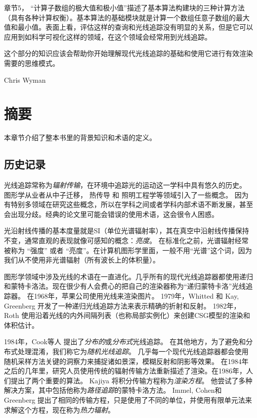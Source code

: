 \documentclass[12pt]{article}
\begin{document}
章节\color{blue}5\color{black}， “计算子数组的极大值和极小值”描述了基本算法构建块的三种计算方法（具有各种计算权衡）。基本算法的基础模块就是计算一个数组任意子数组的最大值和最小值。表面上看，评估这样的查询和光线追踪没有明显的关系，但是它可以应用到如科学可视化这样的领域，在这个领域会经常用到光线追踪。

这个部分的知识应该会帮助你开始理解现代光线追踪的基础和使用它进行有效渲染需要的思维模式。

Chris Wyman
 \section{摘要}
 本章节介绍了整本书里的背景知识和术语的定义。
 \subsection{历史记录}
 光线追踪常称为\textit{辐射传输}，在环境中追踪光的运动这一学科中具有悠久的历史。
 图形学从业者从中子迁移\cite{Arvo:1990:PTI:97880.97886}， 热传导\cite{siegel1981thermal} 和 照明工程学\cite{Larson:1998:RRA:286090}等领域引入了一些概念。
 因为有特别多领域在研究这些概念，所以在学科之间或者学科内部术语不断发展，甚至会出现分歧。经典的论文里可能会错误的使用术语，这会很令人困惑。
 
 光沿射线传播的基本度量就是SI（单位光谱辐射率），其在真空中沿射线传播保持不变，通常直观的表现就像可感知的概念：\textit{亮度}。
 在标准化之前，光谱辐射经常被称为 “强度” 或者 “亮度”。在计算机图形学里面，一般不用“光谱”这个词，因为我们从不使用非光谱辐射（所有波长上的体积量）。
 
 图形学领域中涉及光线的术语在一直进化。几乎所有的现代光线追踪器都使用递归和蒙特卡洛法。现在很少有人会费心的把自己的渲染器称为“递归蒙特卡洛”光线追踪器。
 在1968年，苹果公司\cite{Appel:1968:TSM:1468075.1468082}使用光线来渲染图片。
 1979年，Whitted \cite{Whitted:1980:IIM:358876.358882} 和 Kay, Greenberg \cite{Kay:1979:TCS:800249.807438}开发了一种递归光线追踪方法来表示精确的折射和反射。
 1982年，Roth \cite{ROTH1982109} 使用沿着光线的内外间隔列表（也称局部实例化）来创建CSG模型的渲染和体积估计。
 
 1984年，Cook等人\cite{Cook:1984:DRT:964965.808590} 提出了\textit{分布的}或\textit{分布式}光线追踪。
 在其他地方，为了避免和分布式处理混淆，我们称它为\textit{随机光线追踪}。
 几乎每一个现代光线追踪器都会使用随机采样方法关键的洞察力来捕捉诸如景深，模糊反射和阴影等效果。
 在1984年之后的几年里，研究人员使用传统的辐射传输方法重新描述了渲染。在1986年，人们提出了两个重要的算法。
 Kajiya \cite{Kajiya:1986:RE:15922.15902} 将积分传输方程称为\textit{渲染方程}。 
 他尝试了多种解决方案，其中包括他称为\textit{路径追踪}的蒙特卡洛方法。 
 Immel, Cohen和 Greenberg\cite{Immel:1986:RMN:15922.15901} 提出了相同的传输方程，只是使用了不同的单位，并使用有限单元法来求解这个方程，现在称为\textit{热力辐射}。
 
\end{document}

